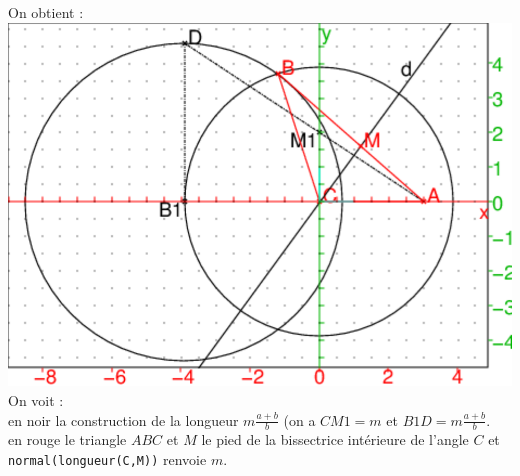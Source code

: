 \documentclass[a4paper,11pt]{book}
\begin{document}
On obtient :\\
\includegraphics[width=\textwidth]{bissect1}\\
On voit :\\
en noir la construction de la longueur $m\frac{a+b}{b}$ (on a 
$CM1=m$ et $B1D=m\frac{a+b}{b}$.\\
en rouge le triangle $ABC$ et $M$ le pied de la bissectrice int\'erieure de 
l'angle $C$ et \\
{\tt normal(longueur(C,M))} renvoie $m$.
\end{document}
